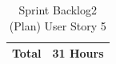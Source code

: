 \documentclass[12pt]{report}
\begin{document}
\begin{table}[h]
{\begin{tabular}{|cc|cccccccc|}
\multicolumn{2}{|c|}{\textbf{Total}}                                                                                                                                                  & \multicolumn{8}{c|}{31   Hours}                                                                                                                                                                                                                                                                                                                                                                                                                                                                                                                                                                                                                                                                                                                                                                                                                                                                                            \\ \hline
\end{tabular}
}
\caption{Sprint Backlog2 (Plan) User Story 5}
\label{tab:mytable}
\end{table}
\end{document}
